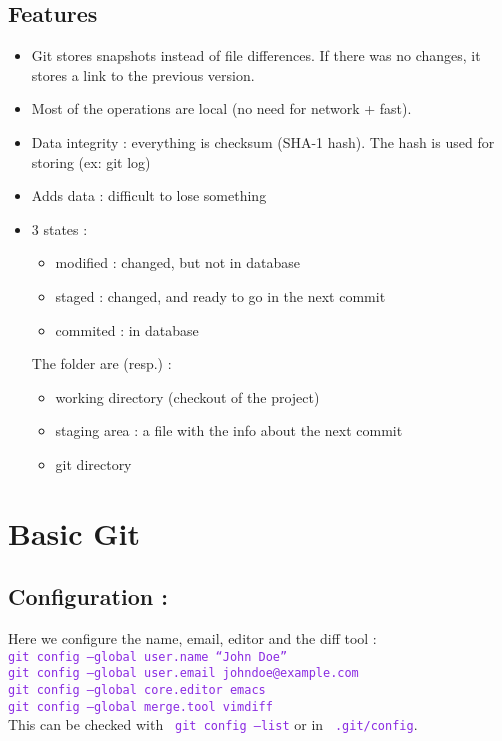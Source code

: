 \documentclass{article}
\newenvironment{myitemize}{
\begin{itemize}
\setlength{\itemsep}{1pt}
\setlength{\parskip}{0pt}
\setlength{\parsep}{0pt}
}{\end{itemize}}
\def\cmd#1{\texttt{\textcolor{blueviolet}{#1}}}
\begin{document}
\subsection{Features}
\begin{myitemize}
\item Git stores snapshots instead of file differences. If
there was no changes, it stores a link to the previous version.
\item Most of the operations are local (no need for network + fast).
\item Data integrity : everything is checksum (SHA-1 hash). The hash is used for
storing (ex: git log)
\item Adds data : difficult to lose something
\item 3 states :  
 \begin{itemize}
  \item modified : changed, but not in database
  \item staged : changed, and ready to go in the next commit
  \item commited : in database
\end{itemize}
The folder are (resp.) :
 \begin{itemize}
  \item working directory (checkout of the project)
  \item staging area : a file with the info about the next commit
  \item git directory
\end{itemize}
\end{myitemize}


\section{Basic Git}
\subsection{Configuration :}
Here we configure the name, email, editor and the diff tool :\\
\cmd{git config --global user.name ``John Doe''}\\
\cmd{git config --global user.email johndoe@example.com}\\
\cmd{git config --global core.editor emacs}\\
\cmd{git config --global merge.tool vimdiff}\\
This can be checked with \cmd{ git config --list} 
or in \cmd{ .git/config}.
\end{document}
